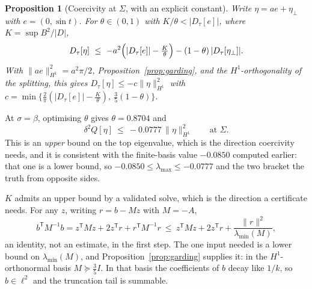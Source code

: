 \documentclass[11pt]{article}
\newtheorem{proposition}[theorem]{Proposition}
\theoremstyle{definition}
\newcommand{\Sig}{\Sigma}
\begin{document}
\begin{proposition}[Coercivity at $\Sig$, with an explicit constant]\label{prop:coerc}
Write $\eta=ae+\eta_\perp$ with $e=(0,\sin t)$. For $\theta\in(0,1)$ with
$K/\theta<|D_\tau[e]|$, where $K=\sup B^2/|D|$,
\[
  D_\tau[\eta]\ \le\ -a^2\Bigl(|D_\tau[e]|-\tfrac K\theta\Bigr)-(1-\theta)\,|D_\tau[\eta_\perp]| .
\]
With $\|ae\|^2_{H^1}=a^2\pi/2$, Proposition~\ref{prop:garding}, and the $H^1$-orthogonality
of the splitting, this gives $D_\tau[\eta]\le-c\|\eta\|^2_{H^1}$ with
$c=\min\bigl\{\tfrac2\pi(|D_\tau[e]|-\tfrac K\theta),\ \tfrac35(1-\theta)\bigr\}$.
\end{proposition}

At $\sigma=\beta$, optimising $\theta$ gives $\theta=0.8704$ and
\[
  \delta^2Q[\eta]\ \le\ -0.0777\,\|\eta\|^2_{H^1}\qquad\text{at }\Sig .
\]
This is an \emph{upper} bound on the top eigenvalue, which is the direction coercivity
needs, and it is consistent with the finite-basis value $-0.0850$ computed earlier: that
one is a lower bound, so $-0.0850\le\lambda_{\max}\le-0.0777$ and the two bracket the truth
from opposite sides.

$K$ admits an upper bound by a validated solve, which is the direction a certificate needs.
For any $z$, writing $r=b-Mz$ with $M=-A$,
\[
  b^{\mathsf T}M^{-1}b = z^{\mathsf T}Mz+2z^{\mathsf T}r+r^{\mathsf T}M^{-1}r
   \ \le\ z^{\mathsf T}Mz+2z^{\mathsf T}r+\frac{\|r\|^2}{\lambda_{\min}(M)} ,
\]
an identity, not an estimate, in the first step. The one input needed is a lower bound on
$\lambda_{\min}(M)$, and Proposition~\ref{prop:garding} supplies it: in the
$H^1$-orthonormal basis $M\succeq\tfrac35 I$. In that basis the coefficients of $b$ decay
like $1/k$, so $b\in\ell^2$ and the truncation tail is summable.
\end{document}
